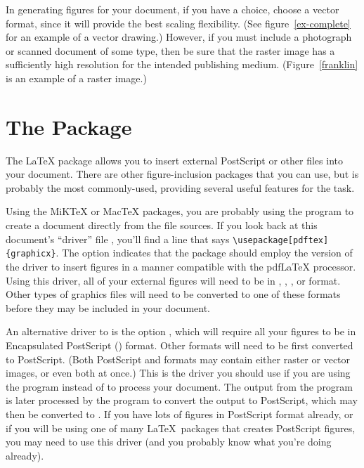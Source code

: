 In generating figures for your document, if you have a choice, choose
a vector format, since it will provide the best scaling flexibility.
(See figure~\ref{ex-complete} for an example of a vector drawing.)
However, if you must include a photograph or scanned document of some
type, then be sure that the raster image has a sufficiently high
resolution for the intended publishing medium. (Figure~\ref{franklin}
is an example of a  raster image.)

\section{The  Package}
The \LaTeX{} package  allows you to insert external
PostScript or other files into your document.  There are other
figure-inclusion packages that you can use, but  is
probably the most commonly-used, providing several useful features for
the task.

Using the MiK\TeX{} or Mac\TeX{} packages, you are probably using the
 program to create a  document directly from
the file sources.  If you look back at this document's ``driver'' file
, you'll find a line that says
\verb|\usepackage[pdftex]{graphicx}|.  The option 
indicates that the  package should employ the
 version of the driver to insert figures in a manner
compatible with the pdf\LaTeX{} processor.  Using this driver, all of
your external figures will need to be in , ,
, or  format.  Other types of graphics files will
need to be converted to one of these formats before they may be
included in your document.

An alternative driver to  is the option , which
will require all your figures to be in Encapsulated PostScript
() format.  Other formats will need to be first converted to
PostScript.  (Both PostScript and  formats may contain
either raster or vector images, or even both at once.)  This is the
driver you should use if you are using the program  instead
of  to process your document.  The  output
from the  program is later processed by the 
program to convert the output to PostScript, which may then be
converted to .  If you have lots of figures in PostScript
format already, or if you will be using one of many \LaTeX\ packages
that creates PostScript figures, you may need to use this driver (and
you probably know what you're doing already).

